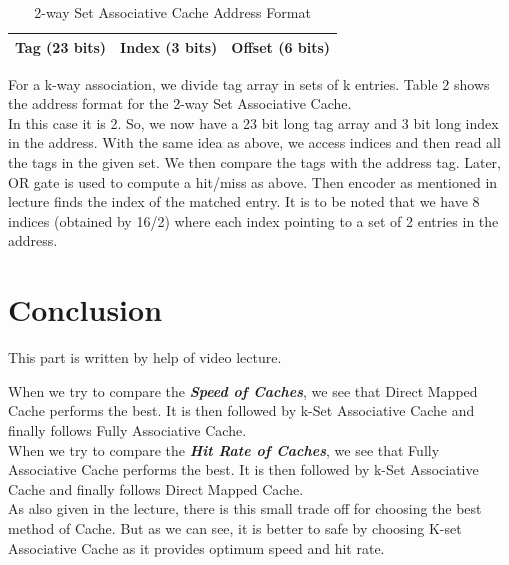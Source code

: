\documentclass[12pt]{article}
\begin{document}
\begin{table}[]
\begin{center}
\begin{tabular}{|l|c|l|}
\hline
\textbf{Tag (23 bits)} & \textbf{Index (3 bits)} & \textbf{Offset (6 bits)} \\ \hline
\end{tabular}
\caption{2-way Set Associative Cache Address Format}
\end{center}
\end{table}

For a k-way association, we divide tag array in sets of k entries. Table 2 shows the address format for the 2-way Set Associative Cache.\\

In this case it is 2. So, we now have a 23 bit long tag array and 3 bit long index in the address. With the same idea as above, we access indices and then read all the tags in the given set. We then compare the tags with the address tag. Later, OR gate is used to compute a hit/miss as above. Then encoder as mentioned in lecture finds the index of the matched entry. It is to be noted that we have 8 indices (obtained by 16/2) where each index pointing to a set of 2 entries in the address.

\section{Conclusion}
This part is written by help of video lecture.

When we try to compare the \textbf{\textit{Speed of Caches}}, we see that Direct Mapped Cache performs the best. It is then followed by k-Set Associative Cache and finally follows Fully Associative Cache. \\

When we try to compare the \textbf{\textit{Hit Rate of Caches}}, we see that Fully Associative Cache performs the best. It is then followed by k-Set Associative Cache and finally follows Direct Mapped Cache. \\

As also given in the lecture, there is this small trade off for choosing the best method of Cache. But as we can see, it is better to safe by choosing K-set Associative Cache as it provides optimum speed and hit rate.
\end{document}
